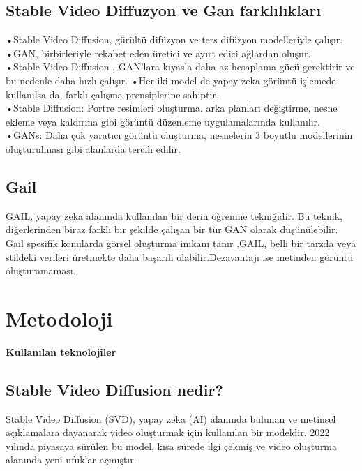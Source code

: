 \documentclass[12pt, a4paper]{article}
\begin{document}
			\subsection{Stable Video Diffuzyon ve Gan farklılıkları}
			•Stable Video Diffusion, gürültü difüzyon ve ters difüzyon modelleriyle çalışır.\\
			•GAN, birbirleriyle rekabet eden üretici ve ayırt edici ağlardan oluşur.\\
			•Stable Video Diffusion , GAN'lara kıyasla daha az hesaplama gücü gerektirir ve bu nedenle daha hızlı çalışır.
			•Her iki model de yapay zeka görüntü işlemede kullanılsa da, farklı çalışma prensiplerine sahiptir.\\
			•Stable Diffusion: Portre resimleri oluşturma, arka planları değiştirme, nesne ekleme veya kaldırma gibi görüntü düzenleme uygulamalarında kullanılır.
			•GANs: Daha çok yaratıcı görüntü oluşturma, nesnelerin 3 boyutlu modellerinin oluşturulması gibi alanlarda tercih edilir. \cite{svd}
			
			\subsection{Gail}
			GAIL,  yapay zeka alanında kullanılan bir derin öğrenme tekniğidir. Bu teknik, diğerlerinden biraz farklı bir şekilde çalışan bir tür GAN olarak düşünülebilir. Gail spesifik konularda görsel oluşturma imkanı tanır .GAIL, belli bir tarzda veya stildeki verileri üretmekte daha başarılı olabilir.Dezavantajı ise metinden görüntü oluşturamaması.\\
			
		
			\section{Metodoloji}
			
			
			\textbf{Kullanılan teknolojiler}	
			\subsection{Stable Video Diffusion nedir?}	
			Stable Video Diffusion (SVD), yapay zeka (AI) alanında bulunan ve metinsel açıklamalara dayanarak video oluşturmak için kullanılan bir modeldir. 2022 yılında piyasaya sürülen bu model, kısa sürede ilgi çekmiş ve video oluşturma alanında yeni ufuklar açmıştır.\\\cite{ yakar2020yapay}
\end{document}
